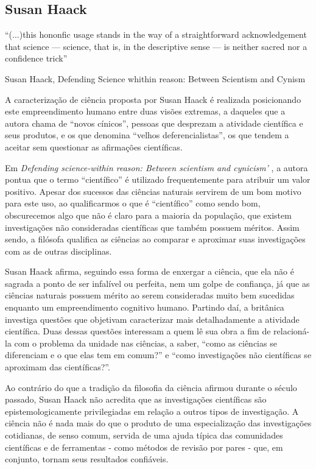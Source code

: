 \documentclass[12pt]{report}
\begin{document}
	\subsection{Susan Haack}
	
		\epigraph{``(...)this hononfic usage
			stands in the way of a straightforward acknowledgement
			that science — science, that is, in the descriptive sense — is
			neither sacred nor a confidence trick''}{Susan Haack, Defending Science whithin reason: Between Scientism and Cynism}
	
		A caracterização de ciência proposta por Susan Haack é realizada posicionando este empreendimento humano entre duas visões extremas, a daqueles que a autora chama de ``novos cínicos'', pessoas que desprezam a atividade científica e seus produtos, e os que denomina ``velhos deferencialistas'', os que tendem a aceitar sem questionar as afirmações científicas. 
		
		Em \textit{Defending science-within reason: Between scientism and cynicism'} \cite{haack-defending-science}, a autora pontua que o termo ``científico'' é utilizado frequentemente para atribuir um valor positivo.
		Apesar dos sucessos das ciências naturais servirem de um bom motivo para este uso, ao qualificarmos o que é ``científico'' como sendo bom, obscurecemos algo que não é claro para a maioria da população, que existem investigações não consideradas científicas que também possuem méritos.
		Assim sendo, a filósofa qualifica as ciências ao comparar e aproximar suas investigações com as de outras disciplinas.
	
		Susan Haack afirma, seguindo essa forma de enxergar a ciência, que ela não é sagrada a ponto de ser infalível ou perfeita, nem um golpe de confiança, já que as ciências naturais possuem mérito ao serem consideradas muito bem sucedidas enquanto um empreendimento cognitivo humano.
		Partindo daí, a britânica investiga questões que objetivam caracterizar mais detalhadamente a atividade científica.
		Duas dessas questões interessam a quem lê sua obra a fim de relacioná-la com o problema da unidade nas ciências, a saber, ``como as ciências se diferenciam e o que elas tem em comum?'' e ``como investigações não científicas se aproximam das científicas?''.
	
		Ao contrário do que a tradição da filosofia da ciência afirmou durante o século passado, Susan Haack não acredita que as investigações científicas são epistemologicamente privilegiadas em relação a outros tipos de investigação.
		A ciência não é nada mais do que o produto de uma especialização das investigações cotidianas, de senso comum, servida de uma ajuda típica das comunidades científicas e de ferramentas - como métodos de revisão por pares - que, em conjunto, tornam seus resultados confiáveis.
		
\end{document}
